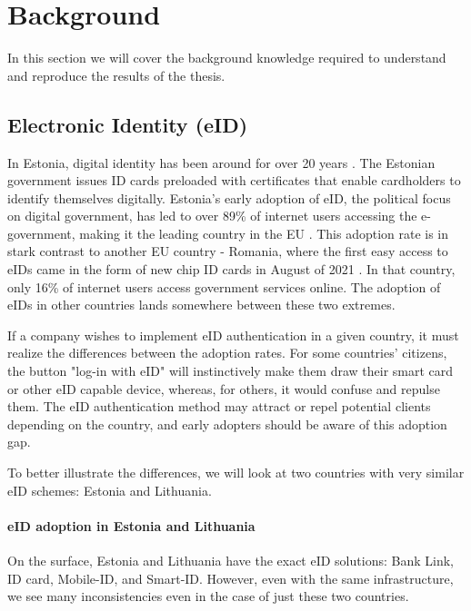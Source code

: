 \section{Background}

In this section we will cover the background knowledge required to understand and reproduce the results of the thesis.

\subsection{Electronic Identity (eID)}

In Estonia, digital identity has been around for over 20 years \cite{eelaw-idcard}. The Estonian government issues ID cards preloaded with certificates that enable cardholders to identify themselves digitally. Estonia's early adoption of eID, the political focus on digital government, has led to over 89\% of internet users accessing the e-government, making it the leading country in the EU \cite{eu-desi}. This adoption rate is in stark contrast to another EU country - Romania, where the first easy access to eIDs came in the form of new chip ID cards in August of 2021 \cite{romania-adopts-eid}. In that country, only 16\% of internet users access government services online. The adoption of eIDs in other countries lands somewhere between these two extremes.

If a company wishes to implement eID authentication in a given country, it must realize the differences between the adoption rates. For some countries' citizens, the button "log-in with eID" will instinctively make them draw their smart card or other eID capable device, whereas, for others, it would confuse and repulse them. The eID authentication method may attract or repel potential clients depending on the country, and early adopters should be aware of this adoption gap.

To better illustrate the differences, we will look at two countries with very similar eID schemes: Estonia and Lithuania.

\paragraph{eID adoption in Estonia and Lithuania}

On the surface, Estonia and Lithuania have the exact eID solutions: Bank Link, ID card, Mobile-ID, and Smart-ID. However, even with the same infrastructure, we see many inconsistencies even in the case of just these two countries.

